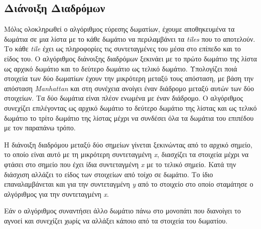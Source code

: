 \subsection{Διάνοιξη Διαδρόμων}
\par
Μόλις ολοκληρωθεί ο αλγόριθμος εύρεσης δωματίων, έχουμε αποθηκευμένα τα δωμάτια σε μια λίστα με το κάθε δωμάτιο να περιλαμβάνει τα \textit{tiles} που το αποτελούν. Το κάθε \textit{tile} έχει ως πληροφορίες τις συντεταγμένες του μέσα στο επίπεδο και το είδος του. Ο αλγόριθμος διάνοιξης διαδρόμων ξεκινάει με το πρώτο δωμάτιο της λίστα ως αρχικό δωμάτιο και το δεύτερο δωμάτιο ως τελικό δωμάτιο. Υπολογίζει ποιά στοιχεία των δύο δωματίων έχουν την μικρότερη μεταξύ τους απόσταση, με βάση την απόσταση \textit{Manhattan} και στη συνέχεια ανοίγει έναν διάδρομο μεταξύ αυτών των δύο στοιχείων. Τα δύο δωμάτια είναι πλέον ενωμένα με έναν διάδρομο. Ο αλγόριθμος συνεχίζει επιλέγοντας ως αρχικό δωμάτιο το δεύτερο δωμάτιο της λίστας και ως τελικό δωμάτιο το τρίτο δωμάτιο της λίστας μέχρι να συνδέσει όλα τα δωμάτια του επιπέδου με τον παραπάνω τρόπο.
\par
H διάνοιξη διαδρόμου μεταξύ δύο σημείων γίνεται ξεκινώντας από το αρχικό σημείο, το οποίο είναι αυτό με τη μικρότερη συντεταγμένη \textit{x}, διασχίζει τα στοιχεία μέχρι να φτάσει στο σημείο που έχει ίδια συντεταγμένη \textit{x} με το τελικό σημείο. Κατά την διάσχιση αλλάζει το είδος των στοιχείων από τοίχο σε δωμάτιο. Το ίδιο επαναλαμβάνεται και για την συντεταγμένη \textit{y} από το στοιχείο στο οποίο σταμάτησε ο αλγόριθμος για την συντεταγμένη \textit{x}.
\par
Εάν ο αλγόριθμος συναντήσει άλλο δωμάτιο πάνω στο μονοπάτι που διανοίγει το αγνοεί και συνεχίζει χωρίς να αλλάξει κάποιο από τα στοιχεία του δωματίου.

